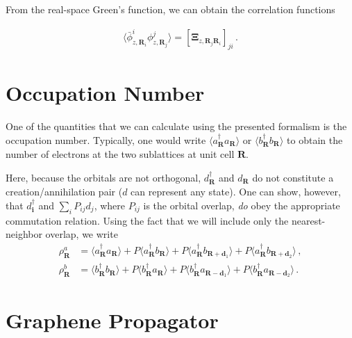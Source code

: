 \documentclass[aps, prb, superscriptaddress, preprint, floatfix]{revtex4-1}
\begin{document}
From the real-space Green's function, we can obtain the correlation functions

%
\begin{align}
    \langle \bar{\phi}_{z,\mathbf{R}_i}^i \phi_{z,\mathbf{R}_j}^j\rangle  = \left[\boldsymbol{\Xi}_{z,\mathbf{R}_j \mathbf{R}_i}\right]_{ji}\,.
\end{align}
%


\section{Occupation Number}

One of the quantities that we can calculate using the presented formalism is the occupation number. Typically, one would write $\langle a_\mathbf{R}^\dagger a_\mathbf{R}\rangle$ or $\langle b_\mathbf{R}^\dagger b_\mathbf{R}\rangle$ to obtain the number of electrons at the two sublattices at unit cell $\mathbf{R}$.

Here, because the orbitals are not orthogonal, $d^\dagger_\mathbf{R}$ and $d_\mathbf{R}$ do not constitute a creation/annihilation pair ($d$ can represent any state). One can show, however, that $d_\mathbf{i}^\dagger$ and $\sum_i P_{ij}d_j$, where $P_{ij}$ is the orbital overlap, \emph{do} obey the appropriate commutation relation. Using the fact that we will include only the nearest-neighbor overlap, we write
%
\begin{align}
	\rho_{\mathbf{R}}^a &= 
	\langle a_\mathbf{R}^\dagger a_\mathbf{R}\rangle 
	+ 
	P\langle a_\mathbf{R}^\dagger b_\mathbf{R}\rangle
	+
	P\langle a_\mathbf{R}^\dagger b_{\mathbf{R}+\mathbf{d}_1}\rangle
	+
	P\langle a_\mathbf{R}^\dagger b_{\mathbf{R}+\mathbf{d}_2}\rangle\,,
	\nonumber
	\\
	\rho_{\mathbf{R}}^b &= 
	\langle b_\mathbf{R}^\dagger b_\mathbf{R}\rangle 
	+ 
	P\langle b_\mathbf{R}^\dagger a_\mathbf{R}\rangle
	+
	P\langle b_\mathbf{R}^\dagger a_{\mathbf{R}-\mathbf{d}_1}\rangle
	+
	P\langle b_\mathbf{R}^\dagger a_{\mathbf{R}-\mathbf{d}_2}\rangle\,.
\end{align}
%




\section{Graphene Propagator}
\label{sec:Propagator}
\end{document}
